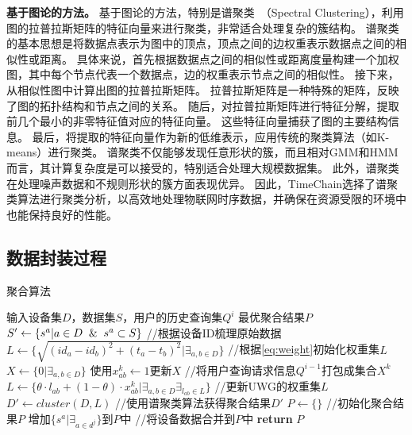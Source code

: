 \textbf{基于图论的方法。}
基于图论的方法，特别是谱聚类~\cite{von2007tutorial}（Spectral Clustering），利用图的拉普拉斯矩阵的特征向量来进行聚类，非常适合处理复杂的簇结构。
谱聚类的基本思想是将数据点表示为图中的顶点，顶点之间的边权重表示数据点之间的相似性或距离。
具体来说，首先根据数据点之间的相似性或距离度量构建一个加权图，其中每个节点代表一个数据点，边的权重表示节点之间的相似性。
接下来，从相似性图中计算出图的拉普拉斯矩阵。
拉普拉斯矩阵是一种特殊的矩阵，反映了图的拓扑结构和节点之间的关系。
随后，对拉普拉斯矩阵进行特征分解，提取前几个最小的非零特征值对应的特征向量。
这些特征向量捕获了图的主要结构信息。
最后，将提取的特征向量作为新的低维表示，应用传统的聚类算法（如K-means）进行聚类。
谱聚类不仅能够发现任意形状的簇，而且相对GMM和HMM而言，其计算复杂度是可以接受的，特别适合处理大规模数据集。
此外，谱聚类在处理噪声数据和不规则形状的簇方面表现优异。
因此，TimeChain选择了谱聚类算法进行聚类分析，以高效地处理物联网时序数据，并确保在资源受限的环境中也能保持良好的性能。

\subsection{数据封装过程}
\begin{algorithm}[t]
	\caption{聚合算法}
	\label{algo:package}
    \begin{algorithmic}[1]
        \REQUIRE 输入设备集$D$，数据集$S$，用户的历史查询集$Q^i$
        \ENSURE 最优聚合结果$P$
        \STATE $S' \gets \{s^a | a \in D \And s^a \subset S\}$ //根据设备ID梳理原始数据
        \STATE $L \gets \Big\{ \sqrt{ (id_a - id_b)^2 + (t_a - t_b)^2 } \Big| \exists_{a,b \in D} \Big\}$ //根据\autoref{eq:weight}初始化权重集$L$
        \STATE $X \gets \{0 | \exists_{a,b \in D} \}$ 
                \STATE \textnormal{使用$x^k_{ab} \gets 1 $更新$X$} //将用户查询请求信息$Q^{i-1}$打包成集合$X^k$
            \ENDIF
        \ENDFOR
        \STATE $L \gets \Big\{ \theta \cdot l_{ab} + (1 - \theta) \cdot x_{ab}^k \Big| \exists_{a,b \in D} \exists_{l_{ab} \in L} \Big\}$ //更新UWG的权重集$L$
        \STATE $D' \gets \textit{cluster}(D, L)$ //使用谱聚类算法获得聚合结果$D'$
        \STATE $P \gets \{\}$ //初始化聚合结果$P$
            \STATE \textnormal{增加$\{ s^a | \exists_{a \in d^j} \}$到$P$中} //将设备数据合并到$P$中
        \ENDFOR
        \STATE \textbf{return} $P$
    \end{algorithmic}
\end{algorithm}


